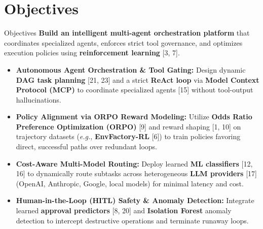 \section{Objectives}

\begin{frame}{Objectives}
    \small
    \textbf{Build an intelligent multi-agent orchestration platform} that coordinates specialized agents, enforces strict tool governance, and optimizes execution policies using \textbf{reinforcement learning} [3, 7].
    \begin{itemize}\itemsep0.45em
        \item \textbf{Autonomous Agent Orchestration \& Tool Gating:} Design dynamic \textbf{DAG task planning} [21, 23] and a strict \textbf{ReAct loop} via \textbf{Model Context Protocol (\textbf{MCP})} to coordinate specialized agents [15] without tool-output hallucinations.
        \item \textbf{Policy Alignment via \textbf{ORPO} Reward Modeling:} Utilize \textbf{Odds Ratio Preference Optimization (\textbf{ORPO})} [9] and reward shaping [1, 10] on trajectory datasets (\textit{e.g.}, \textbf{EnvFactory-RL} [6]) to train policies favoring direct, successful paths over redundant loops.
        \item \textbf{Cost-Aware Multi-Model Routing:} Deploy learned \textbf{ML classifiers} [12, 16] to dynamically route subtasks across heterogeneous \textbf{LLM providers} [17] (OpenAI, Anthropic, Google, local models) for minimal latency and cost.
        \item \textbf{Human-in-the-Loop (\textbf{HITL}) Safety \& Anomaly Detection:} Integrate learned \textbf{approval predictors} [8, 20] and \textbf{Isolation Forest} anomaly detection to intercept destructive operations and terminate runaway loops.
    \end{itemize}
\end{frame}